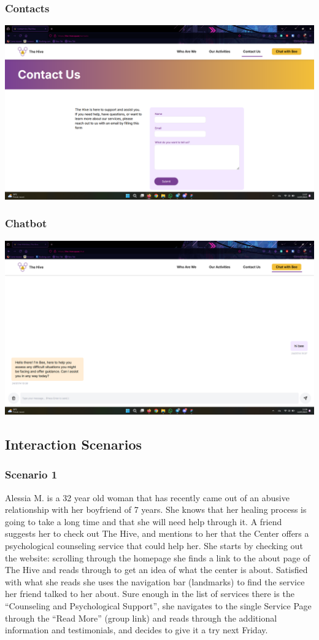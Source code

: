 \subsubsection{Contacts}
\includegraphics[width=0.5\linewidth]{img/design-document/website-screenshots/contacts.png}

\subsubsection{Chatbot}
\includegraphics[width=0.5\linewidth]{img/design-document/website-screenshots/chatbot.png}


\pagebreak
\subsection{Interaction Scenarios}
\subsubsection{Scenario 1}
Alessia M. is a 32 year old woman that has recently came out of an abusive relationship with her boyfriend of 7 years. 
She knows that her healing process is going to take a long time and that she will need help through it. 
A friend suggests her to check out The Hive, and mentions to her that the Center offers a psychological counseling service 
that could help her. She starts by checking out the website: scrolling through the homepage she finds a link to the about page 
of The Hive and reads through to get an idea of what the center is about. Satisfied with what she reads she uses the navigation 
bar (landmarks) to find the service her friend talked to her about. Sure enough in the list of services there is the “Counseling 
and Psychological Support”, she navigates to the single Service Page through the “Read More” (group link) and reads through the 
additional information and testimonials, and decides to give it a try next Friday.

